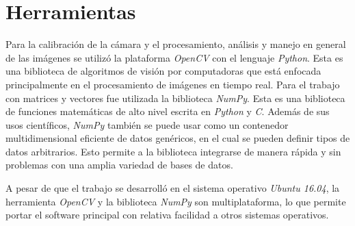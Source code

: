 \section{Herramientas}

Para la calibración de la cámara y el procesamiento, análisis y manejo en general de las imágenes se utilizó la plataforma \textit{OpenCV} con el lenguaje \textit{Python}. Esta es una biblioteca de algoritmos de visión por computadoras que está enfocada principalmente en el procesamiento de imágenes en tiempo real. Para el trabajo con matrices y vectores fue utilizada la biblioteca \textit{NumPy}. Esta es una biblioteca de funciones matemáticas de alto nivel escrita en \textit{Python} y \textit{C}. Además de sus usos científicos, \textit{NumPy} también se puede usar como un contenedor multidimensional eficiente de datos genéricos, en el cual se pueden definir tipos de datos arbitrarios. Esto permite a la biblioteca integrarse de manera rápida y sin problemas con una amplia variedad de bases de datos.

A pesar de que el trabajo se desarrolló en el sistema operativo \textit{Ubuntu 16.04}, la herramienta \textit{OpenCV} y la biblioteca \textit{NumPy} son multiplataforma, lo que permite portar el software principal con relativa facilidad a otros sistemas operativos.
